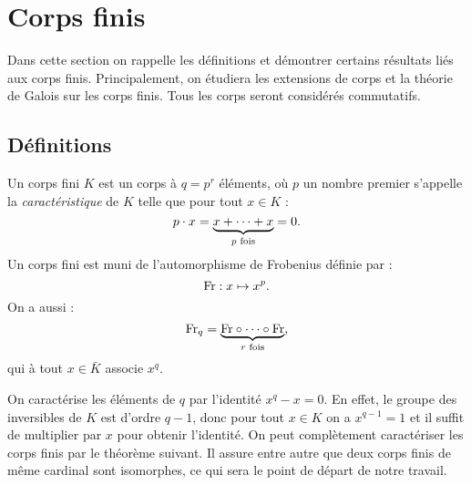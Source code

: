 \documentclass[a4paper]{article} %
\numberwithin{section}{part}
\numberwithin{equation}{section}
\begin{document}
\section{Corps finis}
Dans cette section on rappelle les définitions et démontrer certains 
résultats liés aux corps finis. Principalement, on étudiera les extensions 
de corps et la théorie de Galois sur les corps finis. Tous les corps seront
considérés commutatifs. 

\subsection{Définitions}
Un corps fini $K$ est un corps à $q = p^r$ éléments, où $p$ un nombre premier
s'appelle la \emph{caractéristique} de $K$ telle que pour tout $x\in K$ :
\begin{equation}
p\cdot x = \underbrace{x+\dots+x}_{p\textup{ fois}} = 0.
\end{equation}
Un corps fini est muni de l'automorphisme de Frobenius définie par :
\begin{equation}
\textup{Fr} : x \mapsto x^p.
\end{equation}
On a aussi :
\begin{equation}
\textup{Fr}_q = \underbrace{\textup{Fr}\circ\cdots\circ\textup{Fr}}_{r\textup{
fois}},
\end{equation}
qui à tout $x\in \bar{K}$ associe $x^q$.\par
On caractérise les éléments de $q$ par l'identité $x^q - x = 0$. En effet, le
groupe des inversibles de $K$ est d'ordre $q-1$, donc pour tout $x\in K$ on a
$x^{q-1} = 1$ et il suffit de multiplier par $x$ pour obtenir l'identité.
On peut complètement caractériser les corps finis par le théorème suivant. Il
assure entre autre que deux corps finis de même cardinal sont isomorphes, ce qui
sera le point de départ de notre travail.
\end{document}
